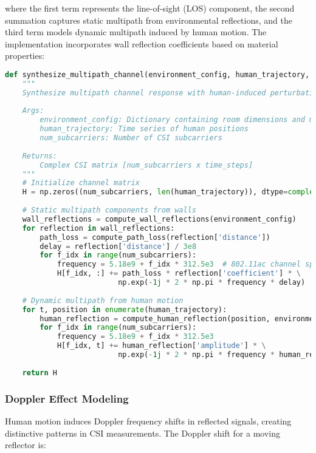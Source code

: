 \documentclass[journal]{IEEEtran}
\begin{document}
where the first term represents the line-of-sight (LOS) component, the second summation captures static multipath from environmental reflections, and the third term models dynamic multipath induced by human motion. The implementation incorporates wall reflection coefficients based on material properties:

\begin{lstlisting}[language=Python, caption=Multipath Channel Synthesis]
def synthesize_multipath_channel(environment_config, human_trajectory, num_subcarriers=114):
    """
    Synthesize multipath channel response with human-induced perturbations
    
    Args:
        environment_config: Dictionary containing room dimensions and materials
        human_trajectory: Time series of human positions
        num_subcarriers: Number of CSI subcarriers
    
    Returns:
        Complex CSI matrix [num_subcarriers x time_steps]
    """
    # Initialize channel matrix
    H = np.zeros((num_subcarriers, len(human_trajectory)), dtype=complex)
    
    # Static multipath components from walls
    wall_reflections = compute_wall_reflections(environment_config)
    for reflection in wall_reflections:
        path_loss = compute_path_loss(reflection['distance'])
        delay = reflection['distance'] / 3e8
        for f_idx in range(num_subcarriers):
            frequency = 5.18e9 + f_idx * 312.5e3  # 802.11ac channel spacing
            H[f_idx, :] += path_loss * reflection['coefficient'] * \
                          np.exp(-1j * 2 * np.pi * frequency * delay)
    
    # Dynamic multipath from human motion
    for t, position in enumerate(human_trajectory):
        human_reflection = compute_human_reflection(position, environment_config)
        for f_idx in range(num_subcarriers):
            frequency = 5.18e9 + f_idx * 312.5e3
            H[f_idx, t] += human_reflection['amplitude'] * \
                          np.exp(-1j * 2 * np.pi * frequency * human_reflection['delay'])
    
    return H
\end{lstlisting}

\subsubsection{Doppler Effect Modeling}

Human motion induces Doppler frequency shifts in reflected signals, creating distinctive patterns in CSI measurements. The Doppler shift for a moving reflector is:
\end{document}
